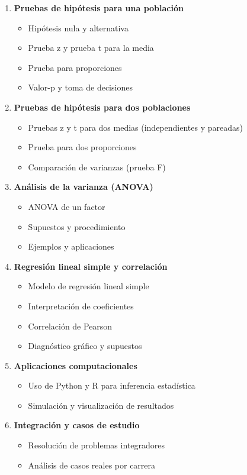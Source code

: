 \begin{enumerate}
    \item \textbf{Pruebas de hipótesis para una población}
    \begin{itemize}
        \item Hipótesis nula y alternativa
        \item Prueba z y prueba t para la media
        \item Prueba para proporciones
        \item Valor-p y toma de decisiones
    \end{itemize}
    \item \textbf{Pruebas de hipótesis para dos poblaciones}
    \begin{itemize}
        \item Pruebas z y t para dos medias (independientes y pareadas)
        \item Prueba para dos proporciones
        \item Comparación de varianzas (prueba F)
    \end{itemize}
    \item \textbf{Análisis de la varianza (ANOVA)}
    \begin{itemize}
        \item ANOVA de un factor
        \item Supuestos y procedimiento
        \item Ejemplos y aplicaciones
    \end{itemize}
    \item \textbf{Regresión lineal simple y correlación}
    \begin{itemize}
        \item Modelo de regresión lineal simple
        \item Interpretación de coeficientes
        \item Correlación de Pearson
        \item Diagnóstico gráfico y supuestos
    \end{itemize}
    \item \textbf{Aplicaciones computacionales}
    \begin{itemize}
        \item Uso de Python y R para inferencia estadística
        \item Simulación y visualización de resultados
    \end{itemize}
    \item \textbf{Integración y casos de estudio}
    \begin{itemize}
        \item Resolución de problemas integradores
        \item Análisis de casos reales por carrera
    \end{itemize}
\end{enumerate}
